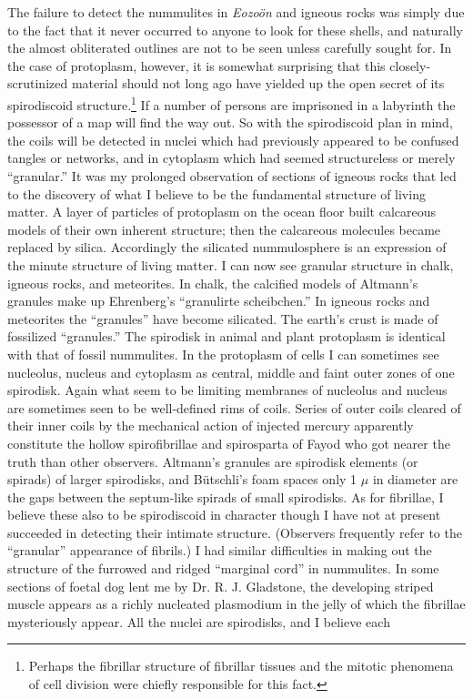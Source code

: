 \documentclass[a4paper, 12pt, oneside, landscape]{article}
\begin{document}
The failure to detect the nummulites in \emph{Eozoön} and igneous rocks was simply due to the fact that it never occurred to anyone to look for these shells, and naturally the almost obliterated outlines are not to be seen unless carefully sought for. In the case of protoplasm, however, it is somewhat surprising that this closely-scrutinized material should not long ago have yielded up the open secret of its spirodiscoid structure.\footnote{Perhaps the fibrillar structure of fibrillar tissues and the mitotic phenomena of cell division were chiefly responsible for this fact.} If a number of persons are imprisoned in a labyrinth the possessor of a map will find the way out. So with the spirodiscoid plan in mind, the coils will be detected in nuclei which had previously appeared to be confused tangles or networks, and in cytoplasm which had seemed structureless or merely ``granular.'' It was my prolonged observation of sections of igneous rocks that led to the discovery of what I believe to be the fundamental structure of living matter. A layer of particles of protoplasm on the ocean floor built calcareous models of their own inherent structure; then the calcareous molecules became replaced by silica. Accordingly the silicated nummulosphere is an expression of the minute structure of living matter. I can now see granular structure in chalk, igneous rocks, and meteorites. In chalk, the calcified models of Altmann's granules make up Ehrenberg's ``granulirte scheibchen.'' In igneous rocks and meteorites the ``granules'' have become silicated. The earth's crust is made of fossilized ``granules.'' The spirodisk in animal and plant protoplasm is identical with that of fossil nummulites. In the protoplasm of cells I can sometimes see nucleolus, nucleus and cytoplasm as central, middle and faint outer zones of one spirodisk. Again what seem to be limiting membranes of nucleolus and nucleus are sometimes seen to be well-defined rims of coils. Series of outer coils cleared of their inner coils by the mechanical action of injected mercury apparently constitute the hollow spirofibrillae and spirosparta of Fayod who got nearer the truth than other observers. Altmann's granules are spirodisk elements (or spirads) of larger spirodisks, and Bütschli's foam spaces only 1 $\mu$ in diameter are the gaps between the septum-like spirads of small spirodisks. As for fibrillae, I believe these also to be spirodiscoid in character though I have not at present succeeded in detecting their intimate structure. (Observers frequently refer to the ``granular'' appearance of fibrils.) I had similar difficulties in making out the structure of the furrowed and ridged ``marginal cord'' in nummulites. In some sections of foetal dog lent me by Dr. R. J. Gladstone, the developing striped muscle appears as a richly nucleated plasmodium in the jelly of which the fibrillae mysteriously appear. All the nuclei are spirodisks, and I believe each 
\end{document}
